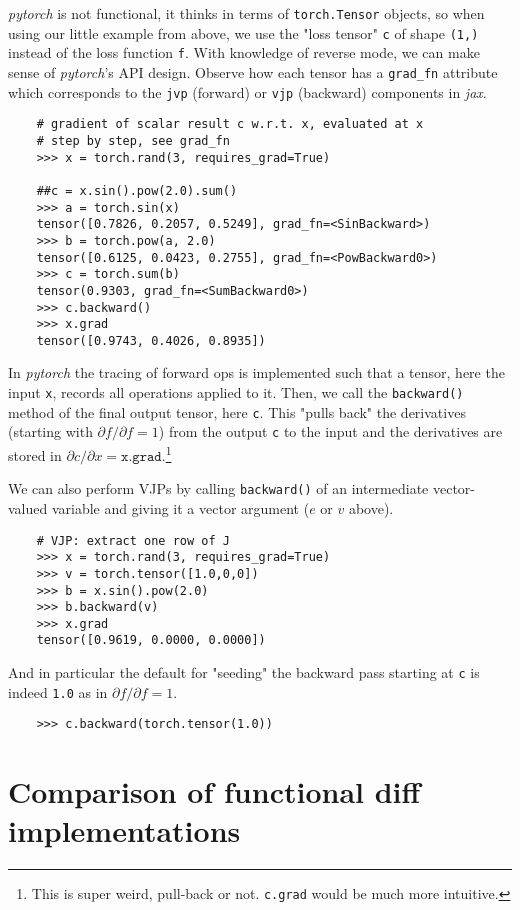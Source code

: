 \documentclass[paper=a4,11pt,headsepline]{scrartcl}
\newcommand{\ve}[1]{\ensuremath{\bm{\mathit{#1}}}}
\newcommand{\pdi}[2]{\partial #1/\partial #2}
\newcommand{\soft}[1]{\textsl{#1}\xspace}
\newcommand{\pytorch}{\soft{pytorch}}
\newcommand{\jax}{\soft{jax}}
\newcommand{\co}[1]{\texttt{#1}}
\begin{document}
\pytorch is not functional, it thinks in terms of \co{torch.Tensor} objects, so
when using our little example from above, we use the "loss tensor" \co{c} of
shape \co{(1,)} instead of the loss function \co{f}. With knowledge of reverse
mode, we can make sense of \pytorch's API design. Observe how each tensor has a
\verb|grad_fn| attribute which corresponds to the \co{jvp} (forward) or
\co{vjp} (backward) components in \jax.
%
\begin{verbatim}
    # gradient of scalar result c w.r.t. x, evaluated at x
    # step by step, see grad_fn
    >>> x = torch.rand(3, requires_grad=True)

    ##c = x.sin().pow(2.0).sum()
    >>> a = torch.sin(x)
    tensor([0.7826, 0.2057, 0.5249], grad_fn=<SinBackward>)
    >>> b = torch.pow(a, 2.0)
    tensor([0.6125, 0.0423, 0.2755], grad_fn=<PowBackward0>)
    >>> c = torch.sum(b)
    tensor(0.9303, grad_fn=<SumBackward0>)
    >>> c.backward()
    >>> x.grad
    tensor([0.9743, 0.4026, 0.8935])
\end{verbatim}
%
In \pytorch the tracing of forward ops is implemented such that a tensor, here
the input \co{x}, records all operations applied to it. Then, we call the
\co{backward()} method of the final output tensor, here \co{c}. This
"pulls back" the derivatives (starting with $\pdi{f}{f}=1$) from the output
\co{c} to the input and the derivatives are stored in $\pdi{c}{\ve x} =
\co{x.grad}$.\footnote{This is super weird, pull-back or not.
\co{c.grad} would be much more intuitive.}

We can also perform VJPs by calling \co{backward()} of an intermediate
vector-valued variable and giving it a vector argument ($\ve
e$ or $\ve v$ above).
%
\begin{verbatim}
    # VJP: extract one row of J
    >>> x = torch.rand(3, requires_grad=True)
    >>> v = torch.tensor([1.0,0,0])
    >>> b = x.sin().pow(2.0)
    >>> b.backward(v)
    >>> x.grad
    tensor([0.9619, 0.0000, 0.0000])
\end{verbatim}
And in particular the default for "seeding" the backward pass starting at \co{c}
is indeed \co{1.0} as in $\pdi{f}{f}=1$.
\begin{verbatim}
    >>> c.backward(torch.tensor(1.0))
\end{verbatim}

\section{Comparison of functional diff implementations}
\end{document}
